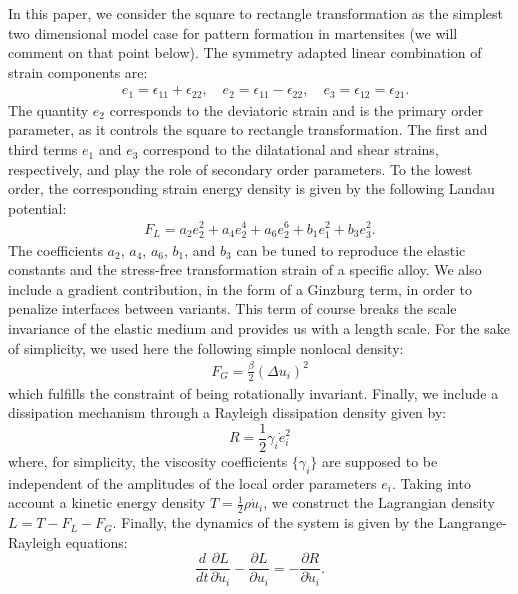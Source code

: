 \documentclass[twocolumn,amsmath,amssymb]{revtex4}
\begin{document}
In this paper, we consider the square to rectangle transformation as the simplest two dimensional model case for pattern formation in martensites (we will comment on that point below). The symmetry adapted linear combination of strain components are:
\begin{align}
&{} e_1=\epsilon_{11}+ \epsilon_{22}, \quad e_2= \epsilon_{11}-\epsilon_{22}, \quad e_3= \epsilon_{12}= \epsilon_{21}.
\label{order_parameters}
\end{align}
The quantity $e_2$ corresponds to the deviatoric strain and is the primary order parameter, as it controls the square to rectangle transformation. The first and third terms $e_1$ and $e_3$ correspond to the dilatational and shear strains, respectively, and play the role of secondary order parameters. To the lowest order, the corresponding  strain energy density is given by the following Landau potential:
%
\begin{align}F_L=a_2e^2_{2} + a_4e^4 _{2}+a_6e^6 _{2}  +b_1e^2_{1}+b_3e^2_{3}. 
\label{strain_energy}
\end{align}
%
The coefficients $a_2$, $a_4$, $a_6$, $b_1$, and $b_3$ can be tuned to reproduce the elastic constants and the stress-free transformation strain of a specific alloy. We also include a gradient contribution, in the form of a Ginzburg term, in order to penalize interfaces between variants. This term of course breaks the scale invariance of the elastic medium and provides us with a length scale. For the sake of simplicity, we used here the following simple nonlocal density:
\begin{align}
  F_G = \frac{\beta}{2}\left(\Delta u_i\right)^2 \label{Ginzburg}
\end{align}
 which fulfills the constraint of being rotationally invariant. Finally, we include a dissipation mechanism through a Rayleigh dissipation density given by:
%
\begin{equation}
R = \frac12 \gamma_i \dot e_i^2
\label{Rayleigh}
\end{equation}
%
where, for simplicity, the viscosity coefficients $\{\gamma_i\}$ are supposed to be independent of the amplitudes of the local order parameters $e_i$. 
Taking into account a kinetic energy density $T = \frac12 \rho \dot u_i$, we construct the Lagrangian density $L = T-F_L -F_G$. 
Finally, the dynamics of the system is given by  the Langrange-Rayleigh equations:
\begin{equation}
\frac{d}{dt} \frac{\partial L}{\partial \dot u_i} - \frac{\partial L}{\partial  u_i} = - \frac{\partial R}{\partial  \dot u_i}.
\end{equation}
\end{document}

